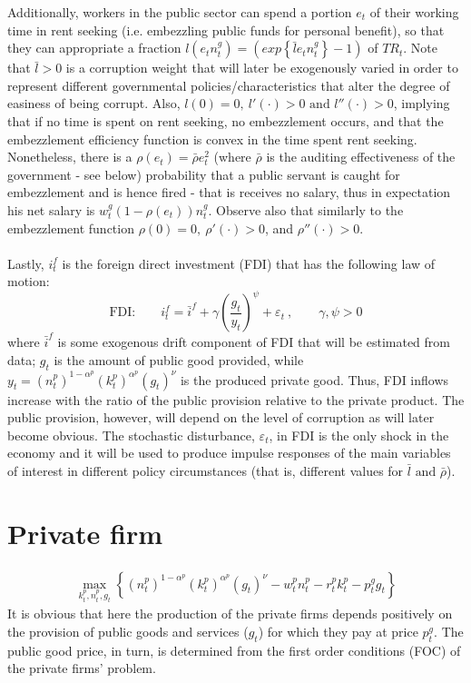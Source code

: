 \documentclass[]{scrartcl}
\begin{document}
Additionally, workers in the public sector can spend a portion $ e_t $ of their working time in rent seeking (i.e. embezzling public funds for personal benefit), so that they can appropriate a fraction $ l(e_tn^g_t)=\left( exp\left\lbrace \bar{l}e_tn^g_t \right\rbrace-1 \right) $ of $ TR_t $. Note that $ \bar{l}>0 $ is a corruption weight that will later be exogenously varied in order to represent different governmental policies/characteristics that alter the degree of easiness of being corrupt. Also, $ l(0)=0,~l'(\cdot)>0\text{ and } l''(\cdot)>0 $, implying that if no time is spent on rent seeking, no embezzlement occurs, and that the embezzlement efficiency function is convex in the time spent rent seeking. Nonetheless, there is a $ \rho(e_t)=\bar{\rho}e_t^2 $ (where $ \bar{\rho} $ is the auditing effectiveness of the government - see below) probability that a public servant is caught for embezzlement and is hence fired - that is receives no salary, thus in expectation his net salary is $ w^g_t (1-\rho(e_t))n^g_t $. Observe also that similarly to the embezzlement function $ \rho(0)=0,~\rho'(\cdot)>0 $, and $ \rho''(\cdot)>0 $. \\\\
Lastly, $ i^f_t $ is the foreign direct investment (FDI) that has the following law of motion:
\begin{equation}
\text{FDI:}\qquad i^f_t=\bar{i}^f+\gamma\left( \frac{g_t}{y_t} \right)^\psi+\varepsilon_t~, \qquad \gamma,\psi>0
\end{equation}
where $ \bar{i}^f $ is some exogenous drift component of FDI that will be estimated from data; $ g_t $ is the amount of public good provided, while $ y_t=(n_t^p)^{1-\alpha^p}(k_t^p)^{\alpha^p}(g_t)^\nu $ is the produced private good. Thus, FDI inflows increase with the ratio of the public provision relative to the private product. The public provision, however, will depend on the level of corruption as will later become obvious. The stochastic disturbance, $ \varepsilon_t $, in FDI is the only shock in the economy and it will be used to produce impulse responses of the main variables of interest in different policy circumstances (that is, different values for $ \bar{l}\text{ and } \bar{\rho} $).

\section{Private firm}
\begin{align}
\max_{k_t^p,n_t^p,g_t}\left\lbrace (n_t^p)^{1-\alpha^p}(k_t^p)^{\alpha^p}(g_t)^\nu-w^p_tn^p_t-r^p_tk_t^p-p^g_tg_t \right\rbrace
\end{align}
It is obvious that here the production of the private firms depends positively on the provision of public goods and services ($ g_t $) for which they pay at price $ p_t^g $. The public good price, in turn, is determined from the first order conditions (FOC) of the private firms' problem.
\end{document}
